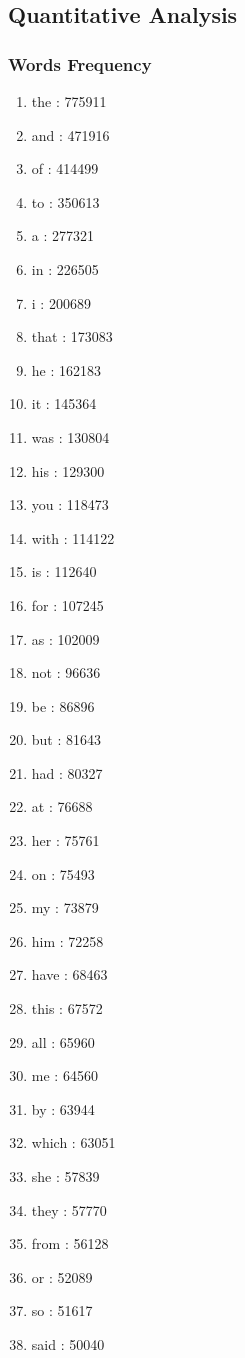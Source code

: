 \documentclass{beamer}
\begin{document}
\subsection{Quantitative Analysis}
\frame
{
  \frametitle{Words Frequency}
\begin{tiny}
\begin{multicols}{4}
\begin{enumerate}
    \item the : 775911
	\item and : 471916
	\item of : 414499
	\item to : 350613
	\item a : 277321
	\item in : 226505
	\item i : 200689
	\item that : 173083
	\item he : 162183
	\item it : 145364
	\item was : 130804
	\item his : 129300
	\item you : 118473
	\item with : 114122
	\item is : 112640
	\item for : 107245
	\item as : 102009
	\item not : 96636
	\item be : 86896
	\item but : 81643
	\item had : 80327
	\item at : 76688
	\item her : 75761
	\item on : 75493
	\item my : 73879
	\item him : 72258
	\item have : 68463
	\item this : 67572
	\item all : 65960
	\item me : 64560
	\item by : 63944
	\item which : 63051
	\item she : 57839
	\item they : 57770
	\item from : 56128
	\item or : 52089
	\item so : 51617
	\item said : 50040

\end{enumerate}
\end{multicols}
\end{tiny}}
\end{document}
